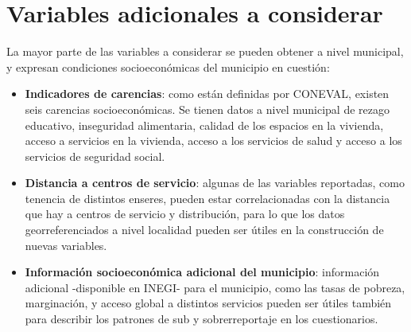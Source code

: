 \section*{Variables adicionales a considerar}
La mayor parte de las variables a considerar se pueden obtener a nivel municipal, y expresan condiciones socioeconómicas del municipio en cuestión:
\begin{itemize}
    \item \textbf{Indicadores de carencias}: como están definidas por CONEVAL, existen seis carencias socioeconómicas. Se tienen datos a nivel municipal de rezago educativo, inseguridad alimentaria, calidad de los espacios en la vivienda, acceso a servicios en la vivienda, acceso a los servicios de salud y acceso a los servicios de seguridad social.
    \item \textbf{Distancia a centros de servicio}: algunas de las variables reportadas, como tenencia de distintos enseres, pueden estar correlacionadas con la distancia que hay a centros de servicio y distribución, para lo que los datos georreferenciados a nivel localidad pueden ser útiles en la construcción de nuevas variables.
    \item \textbf{Información socioeconómica adicional del municipio}: información adicional -disponible en INEGI- para el municipio, como las tasas de pobreza, marginación, y acceso global a distintos servicios pueden ser útiles también para describir los patrones de sub y sobrerreportaje en los cuestionarios.
\end{itemize}


